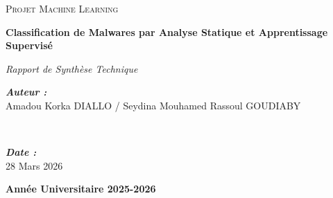 \documentclass[12pt,a4paper]{article}
\begin{document}
\begin{titlepage}
    \begin{center}
    
    \vspace*{1cm}
    
    \begin{tcolorbox}[colback=primary!5!white,colframe=primary,arc=5mm,boxrule=1.5mm,left=1cm,right=1cm,top=1cm,bottom=1cm]
    \centering
    {\scshape\LARGE\color{primary} Projet Machine Learning \par}
    \vspace{1.5cm}
    
    {\Huge\bfseries Classification de Malwares par Analyse Statique et Apprentissage Supervisé\par}
    \vspace{1cm}
    
    {\Large\itshape\color{darkgray} Rapport de Synthèse Technique\par}
    \end{tcolorbox}
    
    \vspace{2.5cm}
    
    \begin{minipage}{0.4\textwidth}
        \begin{flushleft} \large
        \emph{\textbf{Auteur :}}\\
        Amadou Korka DIALLO / Seydina Mouhamed Rassoul GOUDIABY
        \end{flushleft}
    \end{minipage}
    ~
    \begin{minipage}{0.4\textwidth}
        \begin{flushright} \large
        \emph{\textbf{Date :}}\\
        28 Mars 2026
        \end{flushright}
    \end{minipage}
    
    \vfill
    
    {\large\textbf{Année Universitaire 2025-2026}\par}
    \vspace{1cm}
    
    \end{center}
\end{titlepage}

\tableofcontents
\newpage

\end{document}
